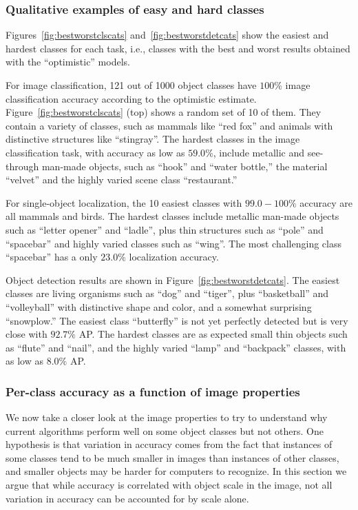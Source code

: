 \subsubsection{Qualitative examples of easy and hard  classes}

Figures~\ref{fig:bestworstclscats} and~\ref{fig:bestworstdetcats} show the easiest and hardest classes for each task, i.e., classes with the best and worst results obtained with the ``optimistic'' models.

For image classification, 121 out of 1000 object classes have $100\%$ image classification accuracy according to the optimistic estimate. Figure~\ref{fig:bestworstclscats} (top) shows a random set of 10 of them. They contain a variety of classes, such as mammals like ``red fox'' and animals with distinctive structures like ``stingray''.  The hardest classes in the image classification task, with accuracy as low as $59.0\%$, include metallic and see-through man-made objects, such as ``hook''  and ``water bottle,'' the material ``velvet''  and the highly varied scene class ``restaurant.''

For single-object localization, the 10 easiest classes with $99.0-100\%$ accuracy are all mammals and birds. The hardest classes include metallic man-made objects such as ``letter opener'' and ``ladle'', plus thin structures such as ``pole'' and ``spacebar'' and highly varied classes such as ``wing''. The most challenging class ``spacebar'' has a only $23.0\%$ localization accuracy. 

Object detection results are shown in Figure~\ref{fig:bestworstdetcats}. The easiest classes are living organisms such as ``dog'' and ``tiger'', plus ``basketball'' and ``volleyball''  with distinctive shape and color, and a somewhat surprising ``snowplow.'' The easiest class ``butterfly'' is not yet perfectly detected but is very close with $92.7\%$ AP. The hardest classes are as expected small thin objects such as  ``flute''  and ``nail'', and the highly varied ``lamp'' and ``backpack'' classes, with as low as $8.0\%$ AP.



\subsubsection{Per-class accuracy as a function of image properties}
\label{sec:imageproperties}

We now take a closer look at the image properties to try to understand why current algorithms perform well on some object classes but not others. One hypothesis is that variation in accuracy comes from the fact that instances of some classes tend to be much smaller in images than instances of other classes, and smaller objects may be harder for computers to recognize. In this section we argue that while accuracy is correlated with object scale in the image, not all variation in accuracy can be accounted for by scale alone.

